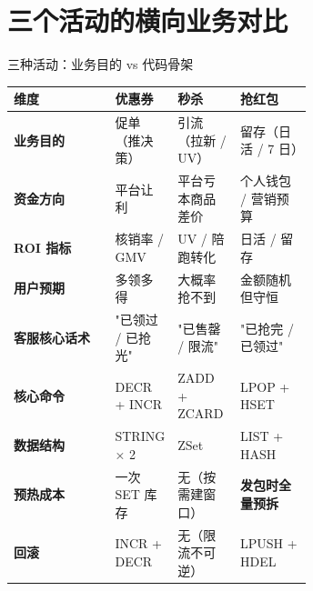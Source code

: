 \documentclass[aspectratio=169,11pt]{beamer}
\begin{document}
\section{三个活动的横向业务对比}

\begin{frame}[shrink]{三种活动：业务目的 vs 代码骨架}
\scriptsize
\begin{tabular}{@{}lp{0.20\linewidth}p{0.21\linewidth}p{0.24\linewidth}@{}}
\toprule
维度 & 优惠券 & 秒杀 & 抢红包 \\
\midrule
\textbf{业务目的}   & 促单（推决策）  & 引流（拉新 / UV） & 留存（日活 / 7 日） \\
\textbf{资金方向}   & 平台让利       & 平台亏本商品差价 & 个人钱包 / 营销预算 \\
\textbf{ROI 指标}   & 核销率 / GMV   & UV / 陪跑转化   & 日活 / 留存 \\
\textbf{用户预期}   & 多领多得       & 大概率抢不到    & 金额随机但守恒 \\
\textbf{客服核心话术}& "已领过 / 已抢光"& "已售罄 / 限流" & "已抢完 / 已领过" \\
\textbf{核心命令}   & DECR + INCR    & ZADD + ZCARD     & LPOP + HSET \\
\textbf{数据结构}   & STRING × 2     & ZSet             & LIST + HASH \\
\textbf{预热成本}   & 一次 SET 库存  & 无（按需建窗口） & \textbf{发包时全量预拆} \\
\textbf{回滚}       & INCR + DECR    & 无（限流不可逆） & LPUSH + HDEL \\
\bottomrule
\end{tabular}
\vspace{2mm}

\end{frame}
\end{document}
